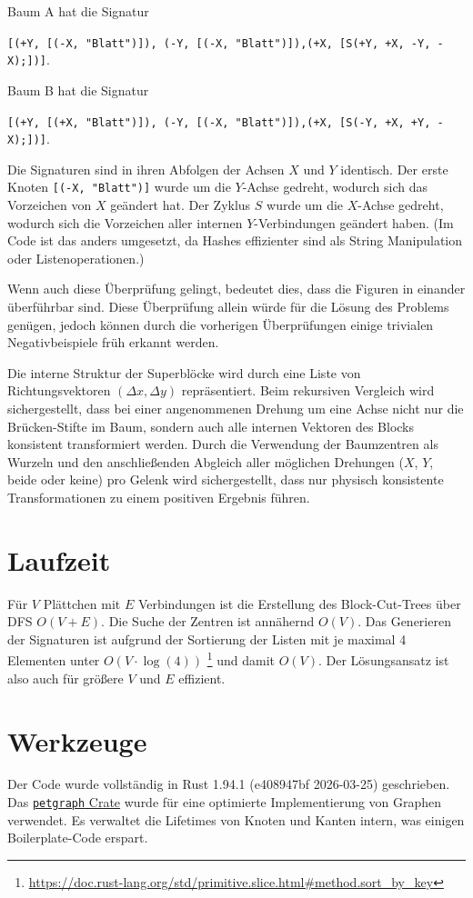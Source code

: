 \documentclass[a4paper,10pt,ngerman]{scrartcl}
\begin{document}
    Baum A hat die Signatur

    \texttt{[(+Y, [(-X, "Blatt")]), (-Y, [(-X, "Blatt")]),(+X, [S(+Y, +X, -Y, -X);])]}.

    Baum B hat die Signatur

    \texttt{[(+Y, [(+X, "Blatt")]), (-Y, [(-X, "Blatt")]),(+X, [S(-Y, +X, +Y, -X);])]}.

    Die Signaturen sind in ihren Abfolgen der Achsen $X$ und $Y$ identisch. Der erste Knoten \texttt{[(-X, "Blatt")]}
    wurde um die $Y$-Achse gedreht, wodurch sich das Vorzeichen von $X$ geändert hat. Der Zyklus $S$ wurde um die
    $X$-Achse gedreht, wodurch sich die Vorzeichen aller internen $Y$-Verbindungen geändert haben. (Im Code ist das
    anders umgesetzt, da Hashes effizienter sind als String Manipulation oder Listenoperationen.)

    Wenn auch diese Überprüfung gelingt, bedeutet dies, dass die Figuren in einander überführbar sind.
    Diese Überprüfung allein würde für die Lösung des Problems genügen, jedoch können durch die vorherigen Überprüfungen
    einige trivialen Negativbeispiele früh erkannt werden.

    Die interne Struktur der Superblöcke wird durch eine Liste von Richtungsvektoren $(\Delta x, \Delta y)$
    repräsentiert. Beim rekursiven Vergleich wird sichergestellt, dass bei einer angenommenen Drehung um eine Achse
    nicht nur die Brücken-Stifte im Baum, sondern auch alle internen Vektoren des Blocks konsistent transformiert werden.
    Durch die Verwendung der Baumzentren als Wurzeln und den anschließenden Abgleich aller möglichen Drehungen
    ($X$, $Y$, beide oder keine) pro Gelenk wird sichergestellt, dass nur physisch konsistente Transformationen zu
    einem positiven Ergebnis führen.

    \section{Laufzeit}\label{sec:laufzeit}
    Für $V$ Plättchen mit $E$ Verbindungen ist die Erstellung des Block-Cut-Trees über DFS $O(V + E)$. Die Suche
    der Zentren ist annähernd $O(V)$. Das Generieren der Signaturen ist aufgrund der Sortierung der Listen mit je
    maximal 4 Elementen unter $O(V \cdot \log(4))$ \footnote{
        \url{https://doc.rust-lang.org/std/primitive.slice.html#method.sort_by_key}
    } und damit $O(V)$.
    Der Lösungsansatz ist also auch für größere $V$ und $E$ effizient.

    \section{Werkzeuge}
    Der Code wurde vollständig in Rust 1.94.1 (e408947bf 2026-03-25) geschrieben.
    Das \href{https://crates.io/crates/petgraph}{\texttt{petgraph} Crate}
    wurde für eine optimierte Implementierung von Graphen verwendet. Es verwaltet die Lifetimes von Knoten und Kanten
    intern, was einigen Boilerplate-Code erspart.
\end{document}
